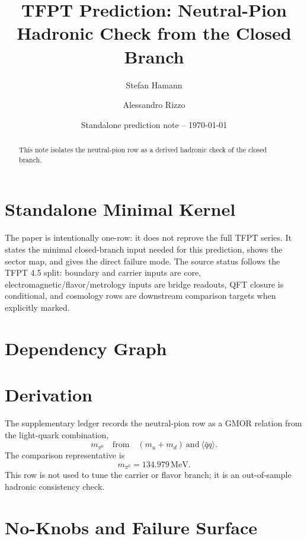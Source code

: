 \documentclass[11pt,a4paper]{article}
\title{\color{tfptblue}\textbf{TFPT Prediction: Neutral-Pion Hadronic Check from the Closed Branch}}
\author{Stefan Hamann \and Alessandro Rizzo}
\date{{\normalsize\color{tfptgray}\sffamily Standalone prediction note -- \today}}
\begin{document}
\maketitle

\begin{abstract}
This note isolates the neutral-pion row as a derived hadronic check of the closed branch.
\end{abstract}



\section{Standalone Minimal Kernel}
\MinimalKernelBox

The paper is intentionally one-row: it does not reprove the full TFPT series. It states the minimal closed-branch input needed for this prediction, shows the sector map, and gives the direct failure mode. The source status follows the TFPT 4.5 split: boundary and carrier inputs are core, electromagnetic/flavor/metrology inputs are bridge readouts, QFT closure is conditional, and cosmology rows are downstream comparison targets when explicitly marked.


\section{Dependency Graph}

\section{Derivation}

The supplementary ledger records the neutral-pion row as a GMOR relation from the light-quark combination,
\[
m_{\pi^0}\quad\text{from}\quad (m_u+m_d)\ \text{and}\ \langle\bar q q\rangle.
\]
The comparison representative is
\[
m_{\pi^0}=134.979\,\mathrm{MeV}.
\]
This row is not used to tune the carrier or flavor branch; it is an out-of-sample hadronic consistency check.


\section{No-Knobs and Failure Surface}
\end{document}
